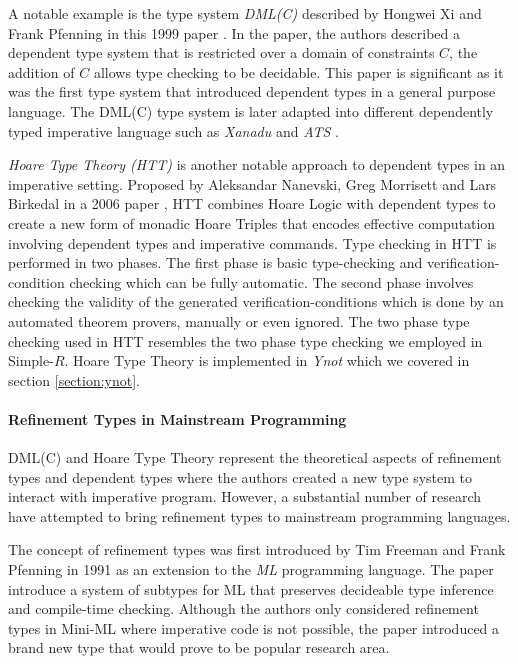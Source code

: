 \documentclass[a4paper,12pt]{report}
\begin{document}
\par
A notable example is the type system \textit{DML(C)} described by 
Hongwei Xi and Frank Pfenning in this 1999 paper \cite{dml}. In the paper, the 
authors described a dependent type system that is restricted over a 
domain of constraints $C$, the addition of $C$ allows type checking to 
be decidable. This paper is significant as it was the first type system that 
introduced dependent types in a general purpose language. The DML(C) type system 
is later adapted into different dependently typed imperative language such as 
\textit{Xanadu} \cite{xanadu} and \textit{ATS} \cite{ATS}.

\par
\textit{Hoare Type Theory (HTT)} is another notable approach to 
dependent types in an imperative setting. Proposed by Aleksandar Nanevski, 
Greg Morrisett and Lars Birkedal in a 2006 paper \cite{htt}, HTT 
combines Hoare Logic with dependent types to create a new form of monadic 
Hoare Triples that encodes effective computation involving dependent types 
and imperative commands. Type checking in HTT is performed in two phases. 
The first phase is basic type-checking and verification-condition checking 
which can be fully automatic. The second phase involves checking the validity 
of the generated verification-conditions 
which is done by an automated theorem provers, manually or even ignored. The two 
phase type checking used in HTT resembles the two phase type checking we 
employed in Simple-$R$. Hoare Type Theory is implemented in \textit{Ynot} which 
we covered in section \ref{section:ynot}.

\paragraph{Refinement Types in Mainstream Programming} DML(C) and Hoare Type 
Theory represent the theoretical aspects of refinement types and dependent 
types where the authors created a new type system to interact with imperative 
program. However, a substantial number of research have attempted to bring  
refinement types to mainstream programming languages. 

\par
The concept of refinement types was first introduced by Tim Freeman and Frank 
Pfenning \cite{refInML} in 1991 as an extension to the \textit{ML} programming 
language. The paper introduce a system of subtypes for ML that preserves 
decideable type inference and compile-time checking. Although the authors 
only considered refinement types in Mini-ML where imperative code is 
not possible, the paper introduced a brand new type that would prove to be popular 
research area. 
\end{document}
